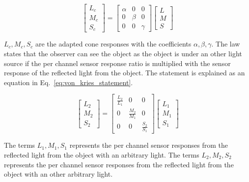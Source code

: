 \begin{equation}
    \begin{bmatrix} 
    L_c \\ 
    M_c \\ 
    S_c 
    \end{bmatrix} = 
    \begin{bmatrix} 
    \alpha & 0 & 0 \\ 
    0 & \beta & 0 \\ 
    0 & 0 & \gamma 
    \end{bmatrix} 
    \begin{bmatrix} 
    L \\ 
    M \\ 
    S 
    \end{bmatrix}
    \label{eq:von_kries_lms}
\end{equation}

$L_c,M_c,S_c$ are the adapted cone responses with the coefficients $\alpha, \beta, \gamma$. The law states that the observer can see the object as the object is under an other light source if the per channel sensor response ratio is multiplied with the sensor response of the reflected light from the object. The statement is explained as an equation in Eq.~\ref{eq:von_kries_statement}.

\begin{equation}
    \begin{bmatrix} 
    L_2 \\ 
    M_2 \\ 
    S_2 
    \end{bmatrix} = 
    \begin{bmatrix} 
    \frac{L_2}{L_1} & 0 & 0 \\ 
    0 & \frac{M_2}{M_1} & 0 \\ 
    0 & 0 & \frac{S_2}{S_1} 
    \end{bmatrix} 
    \begin{bmatrix} 
    L_1 \\ 
    M_1 \\ 
    S_1 
    \end{bmatrix}
\label{eq:von_kries_statement}
\end{equation}

The terms $L_1, M_1, S_1$ represents the per channel sensor responses from the reflected light from the object with an arbitrary light. The terms $L_2, M_2, S_2$ represents the per channel sensor responses from the reflected light from the object with an other arbitrary light.

